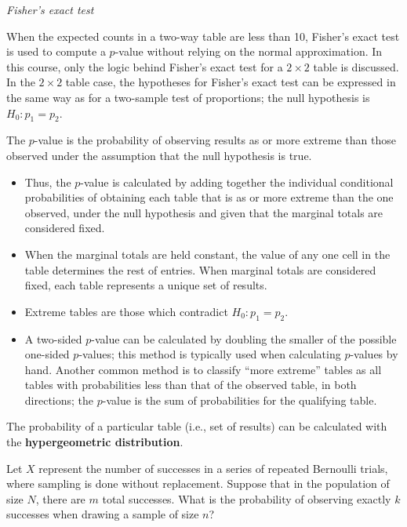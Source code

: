\documentclass[letterpaper,12pt,twoside,]{pinp}
\begin{document}
\vspace{0.5cm}

\emph{Fisher's exact test}

When the expected counts in a two-way table are less than 10, Fisher's
exact test is used to compute a \(p\)-value without relying on the
normal approximation. In this course, only the logic behind Fisher's
exact test for a \(2 \times 2\) table is discussed. In the
\(2 \times 2\) table case, the hypotheses for Fisher's exact test can be
expressed in the same way as for a two-sample test of proportions; the
null hypothesis is \(H_0: p_1 = p_2\).

The \(p\)-value is the probability of observing results as or more
extreme than those observed under the assumption that the null
hypothesis is true.

\begin{itemize}
\item
  Thus, the \(p\)-value is calculated by adding together the individual
  conditional probabilities of obtaining each table that is as or more
  extreme than the one observed, under the null hypothesis and given
  that the marginal totals are considered fixed.
\item
  When the marginal totals are held constant, the value of any one cell
  in the table determines the rest of entries. When marginal totals are
  considered fixed, each table represents a unique set of results.
\item
  Extreme tables are those which contradict \(H_0: p_1 = p_2\).
\item
  A two-sided \(p\)-value can be calculated by doubling the smaller of
  the possible one-sided \(p\)-values; this method is typically used
  when calculating \(p\)-values by hand. Another common method is to
  classify ``more extreme'' tables as all tables with probabilities less
  than that of the observed table, in both directions; the \(p\)-value
  is the sum of probabilities for the qualifying table.
\end{itemize}

The probability of a particular table (i.e., set of results) can be
calculated with the \textbf{hypergeometric distribution}.

Let \(X\) represent the number of successes in a series of repeated
Bernoulli trials, where sampling is done without replacement. Suppose
that in the population of size \(N\), there are \(m\) total successes.
What is the probability of observing exactly \(k\) successes when
drawing a sample of size \(n\)?
\end{document}
